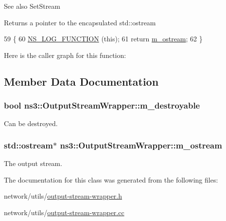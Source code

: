 \begin{DoxySeeAlso}{See also}
Set\+Stream
\end{DoxySeeAlso}
\begin{DoxyReturn}{Returns}
a pointer to the encapsulated std\+::ostream 
\end{DoxyReturn}

\begin{DoxyCode}
59 \{
60   \hyperlink{log-macros-disabled_8h_a90b90d5bad1f39cb1b64923ea94c0761}{NS\_LOG\_FUNCTION} (\textcolor{keyword}{this});
61   \textcolor{keywordflow}{return} \hyperlink{classns3_1_1OutputStreamWrapper_ae89f82c0a92ac9f9a2edca6d28f6b528}{m\_ostream};
62 \}
\end{DoxyCode}


Here is the caller graph for this function\+:




\subsection{Member Data Documentation}
\subsubsection[{\texorpdfstring{m\+\_\+destroyable}{m_destroyable}}]{\setlength{\rightskip}{0pt plus 5cm}bool ns3\+::\+Output\+Stream\+Wrapper\+::m\+\_\+destroyable\hspace{0.3cm}{\ttfamily [private]}}\hypertarget{classns3_1_1OutputStreamWrapper_aaaae2b2be1294f3ad89ab02e8913b5d0}{}\label{classns3_1_1OutputStreamWrapper_aaaae2b2be1294f3ad89ab02e8913b5d0}


Can be destroyed. 

\subsubsection[{\texorpdfstring{m\+\_\+ostream}{m_ostream}}]{\setlength{\rightskip}{0pt plus 5cm}std\+::ostream$\ast$ ns3\+::\+Output\+Stream\+Wrapper\+::m\+\_\+ostream\hspace{0.3cm}{\ttfamily [private]}}\hypertarget{classns3_1_1OutputStreamWrapper_ae89f82c0a92ac9f9a2edca6d28f6b528}{}\label{classns3_1_1OutputStreamWrapper_ae89f82c0a92ac9f9a2edca6d28f6b528}


The output stream. 



The documentation for this class was generated from the following files\+:\begin{DoxyCompactItemize}
\item 
network/utils/\hyperlink{output-stream-wrapper_8h}{output-\/stream-\/wrapper.\+h}\item 
network/utils/\hyperlink{output-stream-wrapper_8cc}{output-\/stream-\/wrapper.\+cc}\end{DoxyCompactItemize}
